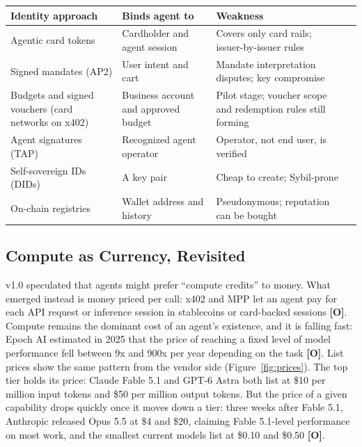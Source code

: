 \documentclass[11pt,letterpaper]{article}
\begin{document}
\begin{center}
\small
\begin{tabularx}{\linewidth}{ZY{0.76}Y{1.04}Y{1.2}}
\toprule
\textbf{Identity approach} & \textbf{Binds agent to} & \textbf{Weakness} \\
\midrule
Agentic card tokens & Cardholder and agent session & Covers only card rails; issuer-by-issuer rules \\
Signed mandates (AP2) & User intent and cart & Mandate interpretation disputes; key compromise \\
Budgets and signed vouchers (card networks on x402) & Business account and approved budget & Pilot stage; voucher scope and redemption rules still forming \\
Agent signatures (TAP) & Recognized agent operator & Operator, not end user, is verified \\
Self-sovereign IDs (DIDs) & A key pair & Cheap to create; Sybil-prone \\
On-chain registries & Wallet address and history & Pseudonymous; reputation can be bought \\
\bottomrule
\end{tabularx}
\end{center}

\subsection{Compute as Currency, Revisited}

v1.0 speculated that agents might prefer ``compute credits'' to money. What emerged instead is money priced per call: x402 and MPP let an agent pay for each API request or inference session in stablecoins or card-backed sessions \textbf{[O]}. Compute remains the dominant cost of an agent's existence, and it is falling fast: Epoch AI estimated in 2025 that the price of reaching a fixed level of model performance fell between 9x and 900x per year depending on the task \textbf{[O]}. List prices show the same pattern from the vendor side (Figure~\ref{fig:prices}). The top tier holds its price: Claude Fable 5.1 and GPT-6 Astra both list at \$10 per million input tokens and \$50 per million output tokens. But the price of a given capability drops quickly once it moves down a tier: three weeks after Fable 5.1, Anthropic released Opus 5.5 at \$4 and \$20, claiming Fable 5.1-level performance on most work, and the smallest current models list at \$0.10 and \$0.50 \textbf{[O]}.
\end{document}
